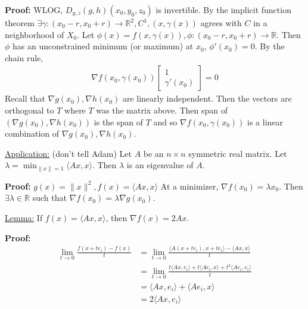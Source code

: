 \documentclass{article}
\newcommand*{\iprod}[1]{\langle #1 \rangle}
\newcommand*{\rr}{\mathbb{R}}%
\begin{document}
\textbf{Proof:} WLOG, $D_{y,z}(g,h)(x_0,y_0,z_0)$ is invertible. By the implicit function theorem $\exists \gamma:(x_0-r,x_0+r)\to \rr^2, C^1, (x,\gamma(x))$ agrees with $C$ in a neighborhood of $X_0$. Let $\phi(x)=f(x,\gamma(x)), \phi:(x_0-r,x_0+r)\to \rr$. Then $\phi$ has an unconstrained minimum (or maximum) at $x_0$, $\phi'(x_0)=0$. By the chain rule, \begin{align*}
    \nabla f(x_0,\gamma(x_0))\begin{bmatrix}
        1\\
        \gamma'(x_0)
    \end{bmatrix}=0
\end{align*}Recall that $\nabla g(x_0),\nabla h(x_0)$ are linearly independent. Then the vectors are orthogonal to $T$ where $T$ was the matrix above. Then span of $(\nabla g(x_0), \nabla h(x_0))$ is the span of $T$ and so $\nabla f(x_0,\gamma(x_0))$ is a linear combination of $\nabla g(x_0), \nabla h(x_0)$.

\underline{Application:} (don't tell Adam) Let $A$ be an $n\times n$ symmetric real matrix. Let $\lambda=\min_{\|x\|=1}\iprod{Ax,x}$. Then $\lambda$ is an eigenvalue of $A$.

\textbf{Proof:} $g(x)=\|x\|^2, f(x)=\iprod{Ax,x}$ At a minimizer, $\nabla f(x_0)=\lambda x_0$. Then $\exists \lambda\in \rr$ such that $\nabla f(x_0)=\lambda\nabla g(x_0)$.

\underline{Lemma:} If $f(x)=\iprod{Ax, x}$, then $\nabla f(x)=2Ax$.

\textbf{Proof:} \begin{align*}
    \lim_{t\to 0}\frac{f(x+te_i)-f(x)}{t}&=\lim_{t\to 0}\frac{\iprod{A(x+te_i),x+te_i}-\iprod{Ax,x}}{t}\\
    &=\lim_{t\to 0}\frac{t\iprod{Ax, e_i}+t\iprod{Ae_i,x}+t^2\iprod{Ae_i,e_i}}{t}\\
    &=\iprod{Ax,e_i}+\iprod{Ae_i,x}\\
    &=2\iprod{Ax,e_i}
\end{align*}
\end{document}
